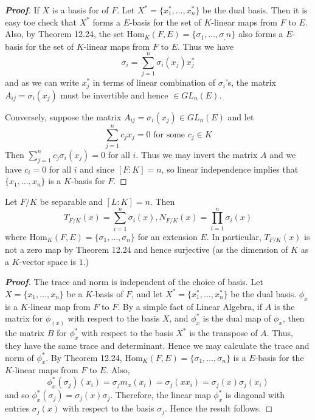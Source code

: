 \begin{proof}[\bf Proof] If $X$ is a basis for of $F$. Let $X^*=\{x^*_1,\ldots,x^*_n\}$ be the dual basis. Then it is easy toe check that $X^*$ forms a $E$-basis for the set of $K$-linear maps from $F$ to $E$. Also, by Theorem 12.24, the set
Hom$_K(F,E)=\{\sigma_1,\ldots,\sigma_,n\}$ also forms a $E$-basis for the set of $K$-linear maps from $F$ to $E$.
Thus we have
$$\sigma_i=\sum_{j=1}^n \sigma_i(x_j)x^*_j$$ and as we can write $x^*_j$ in terms of linear combination of $\sigma_i$'s, the matrix $A_{ij}=\sigma_i(x_j)$ must be invertible and hence $\in GL_n(E)$.

Conversely, suppose the matrix $A_{ij}=\sigma_i(x_j) \in GL_n(E)$ and let
$$\sum_{j=1}^n c_j x_j=0 \text{ for some } c_j \in K$$ Then $\sum_{j=1}^n c_j \sigma_i(x_j)=0$ for all $i$. Thus we may invert the matrix $A$ and we have $c_i=0$ for all $i$ and since $[F:K]=n$, so linear independence implies that $\{x_1,\ldots,x_n\}$ is a $K$-basis for $F$.
\end{proof}
\begin{theorem} Let $F/K$ be separable and $[L:K]=n$. Then
$$T_{F/K}(x)=\sum_{i=1}^n \sigma_i(x), N_{F/K}(x)=\prod_{i=1}^n \sigma_i(x)$$ where
Hom$_K(F,E)=\{\sigma_1,\ldots,\sigma_n\}$ for an extension $E$. In particular, $T_{F/K}(x)$ is not a zero map by Theorem 12.24 and hence surjective (as the dimension of $K$ as a $K$-vector space is $1$.)
\end{theorem}
\begin{proof}[\bf Proof] The trace and norm is independent of the choice of basis. Let $X=\{x_1,\ldots,x_n\}$ be a $K$-basis of $F$, and let $X^*=\{x^*_1,\ldots,x^*_n\}$ be the dual basis. $\phi_x$ is a $K$-linear map from $F$ to $F$. By a simple fact of Linear Algebra, if $A$ is the matrix for $\phi_(x)$ with respect to the basis $X$, and $\phi^*_x$ is the dual map of $\phi_x$, then the matrix $B$ for $\phi^*_x$ with respect to the basis $X^*$ is the transpose of $A$. Thus, they have the same trace and determinant. Hence we may calculate the trace and norm of $\phi^*_x$.
By Theorem 12.24, Hom$_K(F,E)=\{\sigma_1,\ldots,\sigma_n\}$ is a $E$-basis for the $K$-linear maps from $F$ to $E$.
Also,
$$\phi^*_x(\sigma_j)(x_i)=\sigma_j m_x(x_i)=\sigma_j(xx_i)=\sigma_j(x)\sigma_j(x_i)$$
and so $\phi^*_x(\sigma_j)=\sigma_j(x)\sigma_j$. Therefore, the linear map $\phi^*_x$ is diagonal with entries
$\sigma_j(x)$ with respect to the basis $\sigma_j$. Hence the result follows.
\end{proof}

